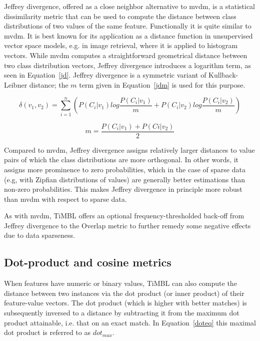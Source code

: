 \documentclass{report}
\begin{document}
Jeffrey divergence, offered as a close neighbor alternative to {\sc
  mvdm}, is a statistical dissimilarity metric that can be used to
compute the distance between class distributions of two values of the
same feature. Functionally it is quite similar to {\sc mvdm}. It is
best known for its application as a distance function in unsupervised
vector space models, e.g. in image retrieval, where it is applied to
histogram vectors. While {\sc mvdm} computes a straightforward
geometrical distance between two class distribution vectors, Jeffrey
divergence introduces a logarithm term, as seen in
Equation~\ref{jd}. Jeffrey divergence is a symmetric variant of
Kullback-Leibner distance; the $m$ term given in Equation~\ref{jdm} is
used for this purpose.

\begin{equation}
\delta(v_{1}, v_{2}) = \sum_{i=1}^{n} 
( P(C_{i}|v_{1}) log \frac{P(C_{i}|v_{1})}{m} +
  P(C_{i}|v_{2}) log \frac{P(C_{i}|v_{2})}{m} )
\label{jd}
\end{equation}

\begin{equation}
m = \frac{P(C_{i}|v_{1}) + P(C{i}|v_{2})}{2}
\label{jdm}
\end{equation}

Compared to {\sc mvdm}, Jeffrey divergence assigns relatively larger
distances to value pairs of which the class distributions are more
orthogonal. In other words, it assigns more prominence to zero
probabilities, which in the case of sparse data (e.g, with Zipfian
distributions of values) are generally better estimations than
non-zero probabilities. This makes Jeffrey divergence in principle
more robust than {\sc mvdm} with respect to sparse data.

As with {\sc mvdm}, TiMBL offers an optional frequency-thresholded
back-off from Jeffrey divergence to the Overlap metric to further
remedy some negative effects due to data sparseness.

\subsection{Dot-product and cosine metrics}
\label{dotproduct}

When features have numeric or binary values, TiMBL can also compute 
the distance between two instances via the dot product (or inner product) 
of their feature-value vectors. The dot product (which is higher with better 
matches) is subsequently inversed to a distance by subtracting it from 
the maximum dot product attainable, i.e. that on an exact match. In 
Equation~\ref{doteq} this maximal dot product is referred to as $dot_{max}$.
\end{document}
